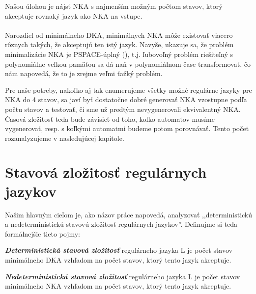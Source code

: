 Našou úlohou je nájsť NKA s najmenším možným počtom stavov, ktorý akceptuje rovnaký jazyk ako NKA na vstupe.
\paragraph{}
Narozdiel od minimálneho DKA, minimálnych NKA môže existovať viacero rôznych takých, že akceptujú ten istý jazyk.
Navyše, ukazuje sa, že problém minimalizácie NKA je PSPACE-úplný (\cite{jiang}), t.j. ľubovoľný problém riešiteľný s polynomiálne veľkou pamäťou sa dá naň v polynomiálnom čase transformovať, čo nám napovedá, že to je zrejme veľmi ťažký problém. 

Pre naše potreby, nakoľko aj tak enumerujeme všetky možné regulárne jazyky pre NKA do 4 stavov, sa javí byť dostatočne dobré generovať NKA vzostupne podľa počtu stavov a testovať, či sme už predtým nevygenerovali ekvivalentný NKA. Časová zložitosť teda bude závisieť od toho, koľko automatov musíme vygenerovať, resp. s koľkými automatmi budeme potom porovnávať. Tento počet rozanalyzujeme v nasledujúcej kapitole.


\section{Stavová zložitosť regulárnych jazykov}

Našim hlavným cieľom je, ako názov práce napovedá, analyzovať ,,deterministickú a nedeterministickú stavovú zložitosť regulárnych jazykov''. Definujme si teda formálnejšie tieto pojmy:

\begin{defn}{\textbf {\textit {Deterministická stavová zložitosť}}} regulárneho jazyka L je počet stavov minimálneho DKA vzhľadom na počet stavov, ktorý tento jazyk akceptuje.
\end{defn}

\begin{defn}{\textbf {\textit {Nedeterministická stavová zložitosť}}}  regulárneho jazyka L je počet stavov minimálneho NKA vzhľadom na počet stavov, ktorý tento jazyk akceptuje.
\end{defn}